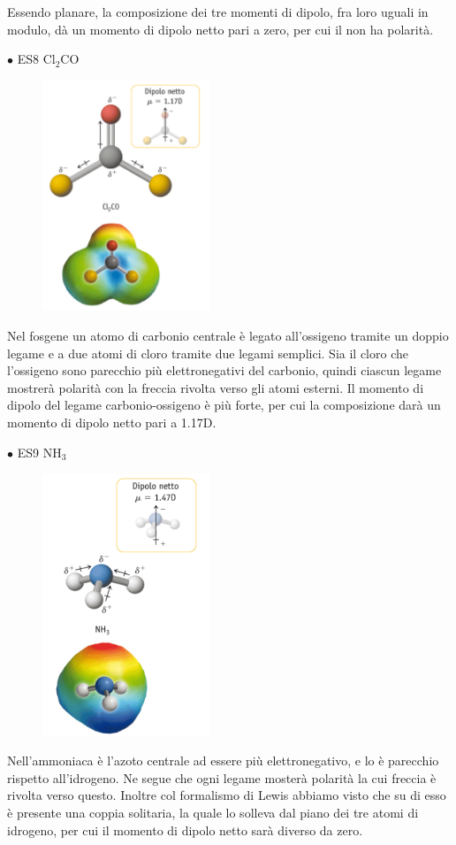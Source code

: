 Essendo planare, la composizione dei tre momenti di dipolo, fra loro uguali in modulo, dà un momento di dipolo netto pari a zero, per cui il  non ha polarità. 

$\bullet$ ES8 Cl$_2$CO
\begin{figure}[htp]
    \centering
    \includegraphics[width=5cm]{immagini/Cl_2CO.png}
\end{figure}
Nel fosgene un atomo di carbonio centrale è legato all'ossigeno tramite un doppio legame e a due atomi di cloro tramite due legami semplici. Sia il cloro che l'ossigeno sono parecchio più elettronegativi del carbonio, quindi ciascun legame mostrerà polarità con la freccia rivolta verso gli atomi esterni. Il momento di dipolo del legame carbonio-ossigeno è più forte, per cui la composizione darà un momento di dipolo netto pari a 1.17D.

$\bullet$ ES9 NH$_3$

\begin{figure}[htp]
    \centering
    \includegraphics[width=5cm]{immagini/NH_3.png}
\end{figure}
Nell'ammoniaca è l'azoto centrale ad essere più elettronegativo, e lo è parecchio rispetto all'idrogeno. Ne segue che ogni legame mosterà polarità la cui freccia è rivolta verso questo. Inoltre col formalismo di Lewis abbiamo visto che su di esso è presente una coppia solitaria, la quale lo solleva dal piano dei tre atomi di idrogeno, per cui il momento di dipolo netto sarà diverso da zero.

